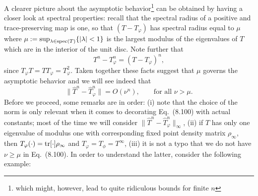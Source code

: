 \documentclass[11pt,a4paper]{article}
\theoremstyle{plain}
\theoremstyle{definition}
\theoremstyle{remark}
\begin{document}
A clearer picture about the asymptotic behavior\footnote{which might, however, lead to quite ridiculous bounds for finite $n$} can be obtained by having a closer look at spectral properties:
recall that the spectral radius of a positive and trace-preserving map is one, so that $(T-T_\varphi)$ has spectral radius equal to $\mu$ where $\mu:=\sup_{\lambda\in\operatorname{spec}(T)}\{|\lambda|<1\}$
is the largest modulus of the eigenvalues of $T$ which are in the interior of the unit disc. Note further that
\begin{equation}\tag{8.99}
    T^n - T_\varphi^n = (T-T_\varphi)^n,
\end{equation}
since $T_\varphi T=TT_\varphi=T_\varphi^2$. Taken together these facts suggest that $\mu$ governs the asymptotic behavior and we will see indeed that
\begin{equation}\tag{8.100}
    \|\hat{T}^n - \hat{T}_\varphi^n\| = O(\nu^n),\qquad \text{for all }\nu>\mu.
\end{equation}
Before we proceed, some remarks are in order:
(i) note that the choice of the norm is only relevant when it comes to decorating Eq.~(8.100) with actual constants; most of the time we will consider
$\|\hat{T}^n-\hat{T}_\varphi^n\|_\infty$,
(ii) if $T$ has only one eigenvalue of modulus one with corresponding fixed point density matrix $\rho_\infty$, then $T_\varphi(\cdot)=\operatorname{tr}[\cdot]\rho_\infty$ and
$T_\varphi=T_\phi=T^\infty$,
(iii) it is not a typo that we do not have $\nu\ge\mu$ in Eq.~(8.100). In order to understand the latter, consider the following example:
\end{document}
